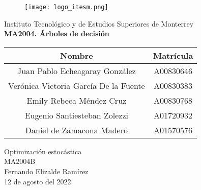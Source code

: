 \documentclass{article}
\begin{document}
    \begin{titlepage}
        \begin{center}
            \begin{figure}
                \centering
                \texttt{[image: logo\_itesm.png]}\\ %
            \end{figure}
        \vspace{5cm}
        \LARGE{Instituto Tecnológico y de Estudios Superiores de Monterrey}\\
        \fontsize{12}{14}\selectfont
        \vspace{1cm}
        \textbf{MA2004. Árboles de decisión}\\ %
        \vspace{0.7cm}
        \begin{table}[h!]
            \centering
            \begin{tabular}{ ||c|c|| }
                \hline
                Nombre & Matrícula \\
                \hline
                Juan Pablo Echeagaray González & A00830646 \\
                \hline
                Verónica Victoria García De la Fuente & A00830383 \\
                \hline
                Emily Rebeca Méndez Cruz & A00830768 \\
                \hline
                Eugenio Santiesteban Zolezzi & A01720932 \\
                \hline
                Daniel de Zamacona Madero & A01570576 \\
                \hline
            \end{tabular}
        \end{table}
        \vspace{0.7cm}
        Optimización estocástica\\ %
        \vspace{0.2cm}
        MA2004B\\ %
        \vspace{0.2cm}
        Fernando Elizalde Ramírez\\ %
        \vspace{0.7cm}
        12 de agosto del 2022\\ %
        \end{center}
    \end{titlepage}
\end{document}
